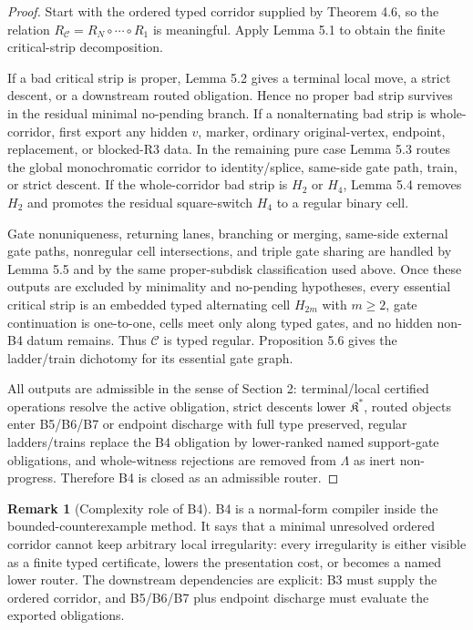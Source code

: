 \documentclass[11pt]{amsart}
\theoremstyle{definition}
\newtheorem{remark}[theorem]{Remark}
\begin{document}
\begin{proof}
Start with the ordered typed corridor supplied by Theorem 4.6, so the relation \(R_{\mathcal C}=R_N\circ\cdots\circ R_1\) is meaningful. Apply Lemma 5.1 to obtain the finite critical-strip decomposition.

If a bad critical strip is proper, Lemma 5.2 gives a terminal local move, a strict descent, or a downstream routed obligation. Hence no proper bad strip survives in the residual minimal no-pending branch. If a nonalternating bad strip is whole-corridor, first export any hidden \(v\), marker, ordinary original-vertex, endpoint, replacement, or blocked-R3 data. In the remaining pure case Lemma 5.3 routes the global monochromatic corridor to identity/splice, same-side gate path, train, or strict descent. If the whole-corridor bad strip is \(H_2\) or \(H_4\), Lemma 5.4 removes \(H_2\) and promotes the residual square-switch \(H_4\) to a regular binary cell.

Gate nonuniqueness, returning lanes, branching or merging, same-side external gate paths, nonregular cell intersections, and triple gate sharing are handled by Lemma 5.5 and by the same proper-subdisk classification used above. Once these outputs are excluded by minimality and no-pending hypotheses, every essential critical strip is an embedded typed alternating cell \(H_{2m}\) with \(m\ge2\), gate continuation is one-to-one, cells meet only along typed gates, and no hidden non-B4 datum remains. Thus \(\mathcal C\) is typed regular. Proposition 5.6 gives the ladder/train dichotomy for its essential gate graph.

All outputs are admissible in the sense of Section 2: terminal/local certified operations resolve the active obligation, strict descents lower \(\mathfrak K^\ast\), routed objects enter B5/B6/B7 or endpoint discharge with full type preserved, regular ladders/trains replace the B4 obligation by lower-ranked named support-gate obligations, and whole-witness rejections are removed from \(\Lambda\) as inert non-progress. Therefore B4 is closed as an admissible router.

\end{proof}
\begin{remark}[Complexity role of B4]
B4 is a normal-form compiler inside the bounded-counterexample method. It says that a minimal unresolved ordered corridor cannot keep arbitrary local irregularity: every irregularity is either visible as a finite typed certificate, lowers the presentation cost, or becomes a named lower router. The downstream dependencies are explicit: B3 must supply the ordered corridor, and B5/B6/B7 plus endpoint discharge must evaluate the exported obligations.

\end{remark}
\end{document}
